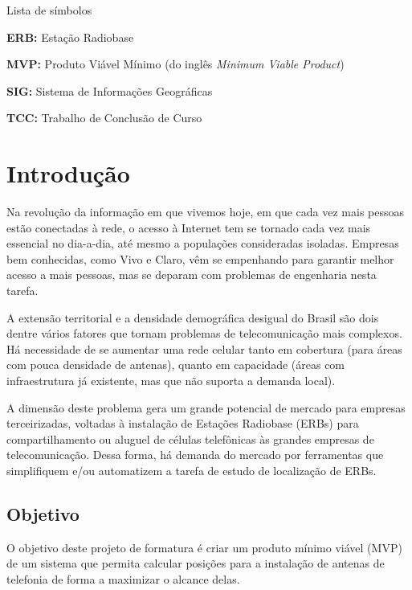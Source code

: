 \documentclass[]{politex}
\begin{document}
\listadefiguras
\listadetabelas

\begin{pretextualsection}{Lista de símbolos}

\textbf{ERB:} Estação Radiobase

\textbf{MVP:} Produto Viável Mínimo (do inglês \textit{Minimum Viable Product})

\textbf{SIG:} Sistema de Informações Geográficas

\textbf{TCC:} Trabalho de Conclusão de Curso

\end{pretextualsection}

\sumario




\chapter{Introdução}
Na revolução da informação em que vivemos hoje, em que cada vez mais pessoas
estão conectadas à rede, o acesso à Internet tem se tornado cada vez mais
essencial no dia-a-dia, até mesmo a populações consideradas isoladas. Empresas
bem conhecidas, como Vivo e Claro, vêm se empenhando para garantir melhor
acesso a mais pessoas, mas se deparam com problemas de engenharia nesta
tarefa.

A extensão territorial e a densidade demográfica desigual do Brasil são dois
dentre vários fatores que tornam problemas de telecomunicação mais complexos.
Há necessidade de se aumentar uma rede celular tanto em cobertura (para áreas
com pouca densidade de antenas), quanto em capacidade (áreas com infraestrutura
já existente, mas que não suporta a demanda local).

A dimensão deste problema gera um grande potencial de mercado para empresas
terceirizadas, voltadas à instalação de Estações Radiobase (ERBs) para
compartilhamento ou aluguel de células telefônicas às grandes empresas de
telecomunicação. Dessa forma, há demanda do mercado por ferramentas que
simplifiquem e/ou automatizem a tarefa de estudo de localização de ERBs.

\section{Objetivo}
O objetivo deste projeto de formatura é criar um produto mínimo viável (MVP) de
um sistema que permita calcular posições para a instalação de antenas de
telefonia de forma a maximizar o alcance delas.
\end{document}
